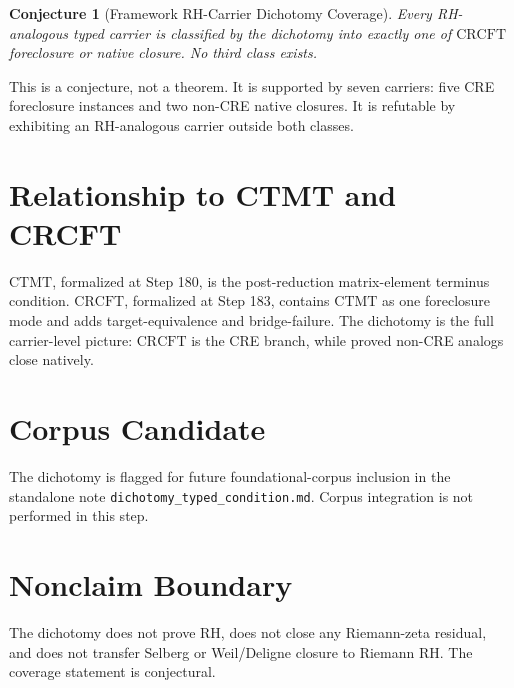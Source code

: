 \documentclass[11pt]{article}
\newtheorem{conjecture}{Conjecture}
\newcommand{\CRCFT}{\mathrm{CRCFT}}
\newcommand{\CTMT}{\mathrm{CTMT}}
\begin{document}
\begin{conjecture}[Framework RH-Carrier Dichotomy Coverage]
Every RH-analogous typed carrier is classified by the dichotomy into exactly
one of \(\CRCFT\) foreclosure or native closure.  No third class exists.
\end{conjecture}

This is a conjecture, not a theorem.  It is supported by seven carriers:
five CRE foreclosure instances and two non-CRE native closures.  It is
refutable by exhibiting an RH-analogous carrier outside both classes.

\section*{Relationship to CTMT and CRCFT}

\(\CTMT\), formalized at Step 180, is the post-reduction matrix-element
terminus condition.  \(\CRCFT\), formalized at Step 183, contains \(\CTMT\) as
one foreclosure mode and adds target-equivalence and bridge-failure.  The
dichotomy is the full carrier-level picture: \(\CRCFT\) is the CRE branch,
while proved non-CRE analogs close natively.

\section*{Corpus Candidate}

The dichotomy is flagged for future foundational-corpus inclusion in the
standalone note \texttt{dichotomy\_typed\_condition.md}.  Corpus integration
is not performed in this step.

\section*{Nonclaim Boundary}

The dichotomy does not prove RH, does not close any Riemann-zeta residual, and
does not transfer Selberg or Weil/Deligne closure to Riemann RH.  The coverage
statement is conjectural.
\end{document}
